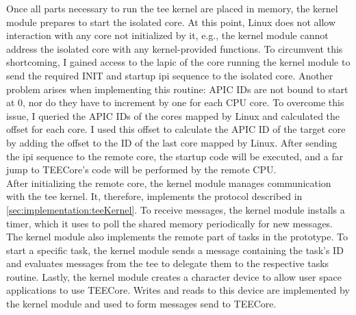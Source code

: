 Once all parts necessary to run the \gls{tee} kernel are placed in memory, the
kernel module prepares to start the isolated core. At this point, Linux does not
allow interaction with any core not initialized by it, e.g., the kernel module
cannot address the isolated core with any kernel-provided functions. To
circumvent this shortcoming, I gained access to the \gls{lapic} of the core
running the kernel module to send the required INIT and startup \gls{ipi}
sequence to the isolated core. Another problem arises when implementing this
routine: APIC IDs are not bound to start at 0, nor do they have to increment by
one for each CPU core. To overcome this issue, I queried the APIC IDs of the
cores mapped by Linux and calculated the offset for each core. I used this
offset to calculate the APIC ID of the target core by adding the offset to the
ID of the last core mapped by Linux. After sending the \gls{ipi} sequence to the
remote core, the startup code will be executed, and a far jump to TEECore's code
will be performed by the remote CPU.\\

After initializing the remote core, the kernel module manages communication with
the \gls{tee} kernel. It, therefore, implements the protocol described in
\ref{sec:implementation:teeKernel}. To receive messages, the kernel module
installs a timer, which it uses to poll the shared memory periodically for new
messages. The kernel module also implements the remote part of tasks in the
prototype. To start a specific task, the kernel module sends a message
containing the task's ID and evaluates messages from the \gls{tee} to delegate
them to the respective tasks routine. Lastly, the kernel module creates a
character device to allow user space applications to use TEECore. Writes and
reads to this device are implemented by the kernel module and used to form
messages send to TEECore.



